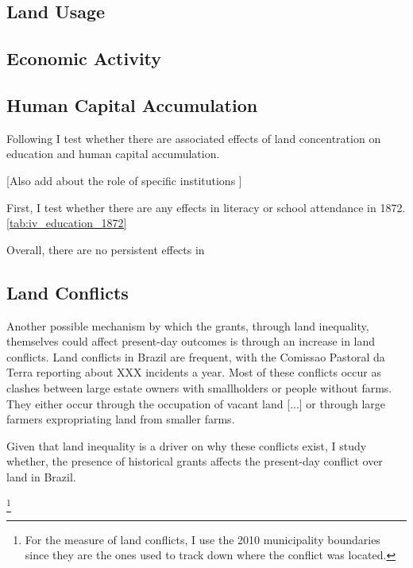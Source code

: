 \documentclass{article}
\begin{document}
\subsection{Land Usage}



\subsection{Economic Activity}

\subsection{Human Capital Accumulation}

Following \textcite{Galor2009-bc} I test whether there are associated effects of land concentration on education and human capital accumulation.

[Also add about the role of specific institutions \parencite{Acemoglu2005-ti}]

First, I test whether there are any effects in literacy or school attendance in 1872. \autoref{tab:iv_education_1872}

Overall, there are no persistent effects in

\subsection{Land Conflicts}

Another possible mechanism by which the grants, through land inequality, themselves could affect present-day outcomes is through an increase in land conflicts. 
Land conflicts in Brazil are frequent, with the Comissao Pastoral da Terra reporting about XXX incidents a year.
Most of these conflicts occur as clashes between large estate owners with smallholders or people without farms.
They either occur through the occupation of vacant land [...] or through large farmers expropriating land from smaller farms. 

Given that land inequality is a driver on why these conflicts exist, I study whether, the presence of historical grants affects the present-day conflict over land in Brazil. 

\parencite{Albertus2018-bf}

\footnote{For the measure of land conflicts, I use the 2010 municipality boundaries since they are the ones used to track down where the conflict was located.}
\end{document}
